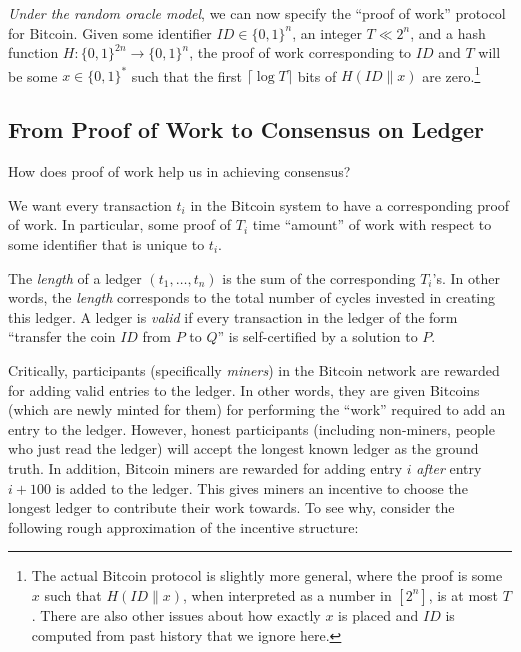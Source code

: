\emph{Under the random oracle model}, we can now specify the ``proof of
work'' protocol for Bitcoin. Given some identifier
\(\ensuremath{\mathit{ID}}\in\{0,1\}^n\), an integer \(T \ll 2^n\), and
a hash function \(H:\{0,1\}^{2n}\rightarrow\{0,1\}^n\), the proof of
work corresponding to \(\ensuremath{\mathit{ID}}\) and \(T\) will be
some \(x\in\{0,1\}^*\) such that the first \(\lceil \log T \rceil\) bits
of \(H(\ensuremath{\mathit{ID}}\| x)\) are zero.\footnote{The actual
  Bitcoin protocol is slightly more general, where the proof is some
  \(x\) such that \(H(\ensuremath{\mathit{ID}}\|x)\), when interpreted
  as a number in \([2^n]\), is at most \(T\). There are also other
  issues about how exactly \(x\) is placed and
  \(\ensuremath{\mathit{ID}}\) is computed from past history that we
  ignore here.}

\subsection{From Proof of Work to Consensus on
Ledger}\label{From-Proof-of-Work-to-Consensu}

How does proof of work help us in achieving consensus?

We want every transaction \(t_i\) in the Bitcoin system to have a
corresponding proof of work. In particular, some proof of \(T_i\) time
``amount'' of work with respect to some identifier that is unique to
\(t_i\).

The \emph{length} of a ledger \((t_1,\ldots,t_n)\) is the sum of the
corresponding \(T_i\)'s. In other words, the \emph{length} corresponds
to the total number of cycles invested in creating this ledger. A ledger
is \emph{valid} if every transaction in the ledger of the form
``transfer the coin \(\ensuremath{\mathit{ID}}\) from \(P\) to \(Q\)''
is self-certified by a solution to \(P\).

Critically, participants (specifically \emph{miners}) in the Bitcoin
network are rewarded for adding valid entries to the ledger. In other
words, they are given Bitcoins (which are newly minted for them) for
performing the ``work'' required to add an entry to the ledger. However,
honest participants (including non-miners, people who just read the
ledger) will accept the longest known ledger as the ground truth. In
addition, Bitcoin miners are rewarded for adding entry \(i\)
\emph{after} entry \(i+100\) is added to the ledger. This gives miners
an incentive to choose the longest ledger to contribute their work
towards. To see why, consider the following rough approximation of the
incentive structure:

